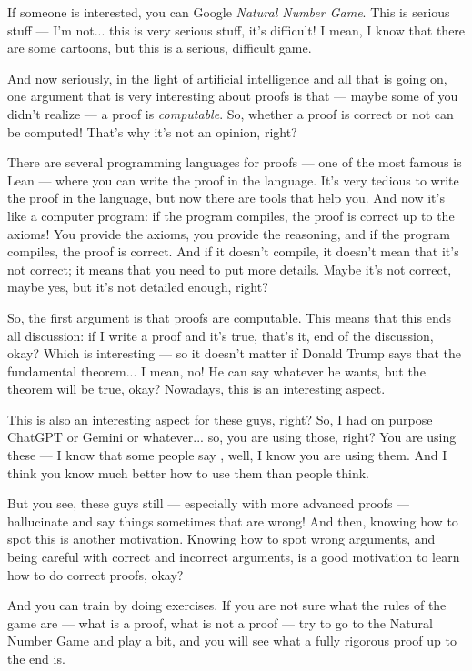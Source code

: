 \begin{spoken-clean}[00:33:00 - 00:35:40]
If someone is interested, you can Google \emph{Natural Number Game}. This is serious stuff --- I'm not... this is very serious stuff, it's difficult! I mean, I know that there are some cartoons, but this is a serious, difficult game.

And now seriously, in the light of artificial intelligence and all that is going on, one argument that is very interesting about proofs is that --- maybe some of you didn't realize --- a proof is \emph{computable}. So, whether a proof is correct or not can be computed! That's why it's not an opinion, right?

There are several programming languages for proofs --- one of the most famous is Lean --- where you can write the proof in the language. It's very tedious to write the proof in the language, but now there are tools that help you. And now it's like a computer program: if the program compiles, the proof is correct up to the axioms! You provide the axioms, you provide the reasoning, and if the program compiles, the proof is correct. And if it doesn't compile, it doesn't mean that it's not correct; it means that you need to put more details. Maybe it's not correct, maybe yes, but it's not detailed enough, right?

So, the first argument is that proofs are computable. This means that this ends all discussion: if I write a proof and it's true, that's it, end of the discussion, okay? Which is interesting --- so it doesn't matter if Donald Trump says that the fundamental theorem... I mean, no! He can say whatever he wants, but the theorem will be true, okay? Nowadays, this is an interesting aspect.
\end{spoken-clean}

\begin{spoken-clean}[00:35:40 - 00:38:15]
This is also an interesting aspect for these guys, right?  So, I had on purpose ChatGPT or Gemini or whatever... so, you are using those, right? You are using these --- I know that some people say , well, I know you are using them. And I think you know much better how to use them than people think.

But you see, these guys still --- especially with more advanced proofs --- hallucinate and say things sometimes that are wrong! And then, knowing how to spot this is another motivation. Knowing how to spot wrong arguments, and being careful with correct and incorrect arguments, is a good motivation to learn how to do correct proofs, okay?

And you can train by doing exercises. If you are not sure what the rules of the game are --- what is a proof, what is not a proof --- try to go to the Natural Number Game and play a bit, and you will see what a fully rigorous proof up to the end is.
\end{spoken-clean}


